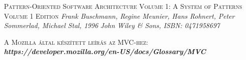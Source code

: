 \documentclass[
]{thesis-ekf}
\theoremstyle{definition}
\theoremstyle{remark}
\begin{document}
\begin{thebibliography}{2}
\textsc{Pattern-Oriented Software Architecture Volume 1: A System of Patterns Volume 1 Edition}
\newline
\emph{Frank Buschmann, Regine Meunier, Hans Rohnert, Peter Sommerlad, Michael Stal, 1996}
\emph{John Wiley \& Sons, ISBN: 0471958697}

\textsc{A Mozilla által készített leírás az MVC-hez:}
\newline
\emph{\bf{https://developer.mozilla.org/en-US/docs/Glossary/MVC}}

\end{thebibliography}

%
\end{document}
